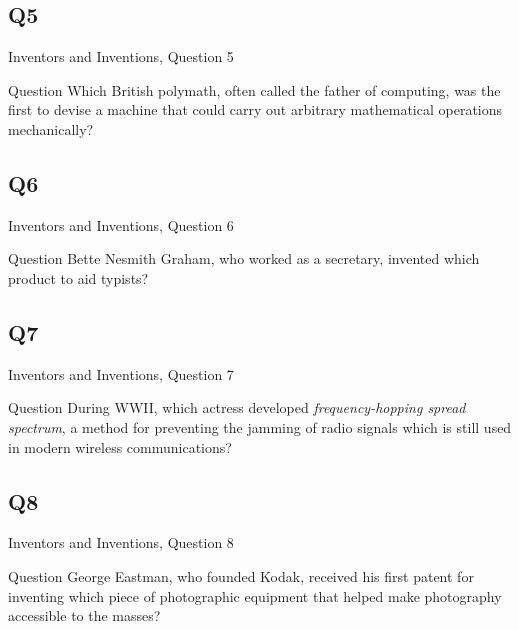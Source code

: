 \documentclass[11pt]{beamer}
\begin{document}
\subsection*{Q5}
\begin{frame}[t]{Inventors and Inventions, Question 5}
\begin{block}{Question}
Which British polymath, often called the father of computing, was the first to devise a machine that could carry out arbitrary mathematical operations mechanically?
\end{block}
\end{frame}
\subsection*{Q6}
\begin{frame}[t]{Inventors and Inventions, Question 6}
\begin{block}{Question}
Bette Nesmith Graham, who worked as a secretary, invented which product to aid typists?
\end{block}
\end{frame}
\subsection*{Q7}
\begin{frame}[t]{Inventors and Inventions, Question 7}
\begin{block}{Question}
During WWII, which actress developed \emph{frequency-hopping spread spectrum}, a method for preventing the jamming of radio signals which is still used in modern wireless communications?
\end{block}
\end{frame}
\subsection*{Q8}
\begin{frame}[t]{Inventors and Inventions, Question 8}
\begin{block}{Question}
George Eastman, who founded Kodak, received his first patent for inventing which piece of photographic equipment that helped make photography accessible to the masses?
\end{block}
\end{frame}
\end{document}
